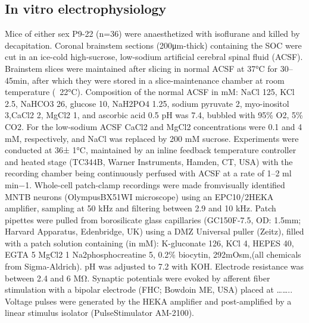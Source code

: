 \documentclass{article}
\begin{document}
\subsection{In vitro electrophysiology}
Mice of either sex P9-22 (n=36) were anaesthetized with isoflurane and killed by decapitation. Coronal brainstem sections (200μm-thick) containing the SOC were cut in an ice-cold high-sucrose, low-sodium artificial cerebral spinal fluid (ACSF). Brainstem slices were maintained after slicing in normal ACSF at 37°C for 30–45min, after which they were stored in a slice-maintenance chamber at room temperature (~22°C). Composition of the normal ACSF in mM: NaCl 125, KCl 2.5, NaHCO3 26, glucose 10, NaH2PO4 1.25, sodium pyruvate 2, myo-inositol 3,CaCl2 2, MgCl2 1, and ascorbic acid 0.5 pH was 7.4, bubbled with 95\% O2, 5\% CO2. For the low-sodium ACSF CaCl2 and MgCl2 concentrations were 0.1 and 4 mM, respectively, and NaCl was replaced by 200 mM sucrose. Experiments were conducted at 36± 1°C, maintained by an inline feedback temperature controller and heated stage (TC344B, Warner Instruments, Hamden, CT, USA) with the recording chamber being continuously perfused with ACSF at a rate of 1–2 ml min−1. Whole-cell patch-clamp recordings were made fromvisually identified MNTB neurons (OlympusBX51WI microscope) using an EPC10/2HEKA amplifier, sampling at 50 kHz and filtering between 2.9 and 10 kHz. Patch pipettes were pulled from borosilicate glass capillaries (GC150F-7.5, OD: 1.5mm; Harvard Apparatus, Edenbridge, UK) using a DMZ Universal puller (Zeitz), filled with a patch solution containing (in mM): K-gluconate 126, KCl 4, HEPES 40, EGTA 5 MgCl2 1 Na2phosphocreatine 5, 0.2\% biocytin, 292mOsm,(all chemicals from Sigma-Aldrich). pH was adjusted to 7.2 with KOH. Electrode resistance was between 2.4 and 6 MΩ. Synaptic potentials were evoked by afferent fiber stimulation with a bipolar electrode (FHC; Bowdoin ME, USA) placed at …….. Voltage pulses were generated by the HEKA amplifier and post-amplified by a linear stimulus isolator (PulseStimulator AM-2100). 
\end{document}
